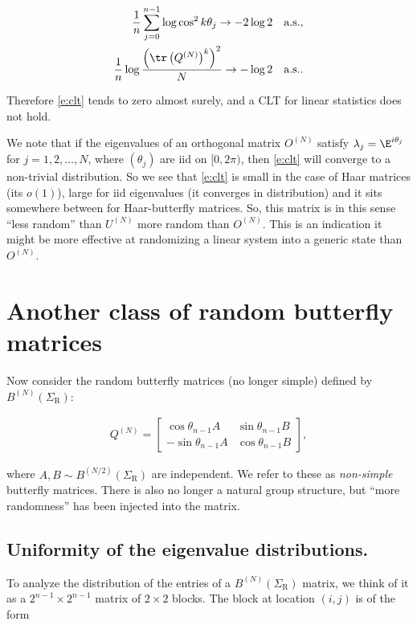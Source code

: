 \begin{align}
  \frac{1}{n} \sum_{j=0}^{n-1} \log \cos^2 k\theta_j \to - 2 \log 2 \quad \text{a.s.},\\
  \frac{1}{n} \log \frac{\left(\tr \left(Q^{(N)} \right)^k  \right)^2}{N} \to - \log 2 \quad \text{a.s.}.
\end{align}

Therefore \eqref{e:clt} tends to zero almost surely, and a CLT for linear statistics does not hold.

We note that if the eigenvalues of an orthogonal matrix $O^{(N)}$ satisfy $\lambda_j = \E^{i \theta_j}$ for $j = 1,2,\ldots,N$, where $(\theta_j)$ are iid on $[0,2\pi)$, then \eqref{e:clt} will converge to a non-trivial distribution.  So we see that \eqref{e:clt} is small in the case of Haar matrices (its $o(1)$), large for iid eigenvalues (it converges in distribution) and it sits somewhere between for Haar-butterfly matrices.  So, this matrix is in this sense ``less random'' than $U^{(N)}$ more random than $O^{(N)}$.  This is an indication it might be more effective at randomizing a linear system into a generic state than $O^{(N)}$.

\section{Another class of random butterfly matrices}\label{s:general}

Now consider the random butterfly matrices (no longer simple) defined by $B^{(N)}(\Sigma_{\mathrm{R}})$:

\begin{align}\label{e:rbf}
Q^{(N)} = \begin{bmatrix} \cos \theta_{n-1} A & \sin \theta_{n-1} B \\
-\sin \theta_{n-1} A & \cos \theta_{n-1} B \end{bmatrix},
\end{align}

where $A,B \sim B ^{(N/2)}(\Sigma_{\mathrm{R}})$ are independent.  We refer to these as \emph{non-simple} butterfly matrices.  There is also no longer a natural group structure, but ``more randomness'' has been injected into the matrix.

\subsection{Uniformity of the eigenvalue distributions.}

To analyze the distribution of the entries of a $B^{(N)}(\Sigma_{\mathrm{R}})$ matrix, we think of it as a $2^{n-1} \times 2^{n-1}$ matrix of $2\times 2$ blocks.  The block at location $(i,j)$ is of the form

